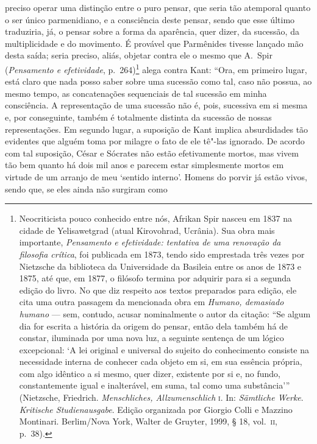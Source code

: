 preciso operar uma distinção entre o puro pensar, que seria tão atemporal
quanto o ser único parmenidiano, e a consciência deste pensar, sendo que esse
último traduziria, já, o pensar sobre a forma da aparência, quer dizer, da
sucessão, da multiplicidade e do movimento. É provável que Parmênides tivesse
lançado mão desta saída; seria preciso, aliás, objetar contra ele o mesmo que
A.~Spir (\textit{Pensamento e efetividade}, p.~264)\footnote{ Neocriticista
pouco conhecido entre nós, Afrikan Spir nasceu em 1837 na cidade de
Yelisawetgrad (atual Kirovohrad, Ucrânia). Sua obra mais importante, \textit{Pensamento 
e efetividade: tentativa de uma renovação da filosofia crítica},
foi publicada em 1873, tendo sido emprestada três vezes por Nietzsche da
biblioteca da Universidade da Basileia entre os anos de 1873 e 1875, até que,
em 1877, o filósofo termina por adquirir para si a segunda edição do livro.
No que diz respeito aos textos preparados para edição, ele cita uma outra
passagem da mencionada obra em \textit{Humano, demasiado humano} --- sem,
contudo, acusar nominalmente o autor da citação: ``Se algum dia for escrita a
história da origem do pensar, então dela também há de constar, iluminada por
uma nova luz, a seguinte sentença de um lógico excepcional: `A lei original e
universal do sujeito do conhecimento consiste na necessidade interna de
conhecer cada objeto em si, em sua essência própria, com algo idêntico a si
mesmo, quer dizer, existente por si e, no fundo, constantemente igual e
inalterável, em suma, tal como uma substância''' (Nietzsche, Friedrich.
\textit{Menschliches, Allzumenschlich} \textsc{i.} In:
\textit{Sämtliche Werke}. \textit{Kritische Studienausgabe}. Edição organizada
 por Giorgio Colli e Mazzino Montinari. Berlim/Nova York, Walter de Gruyter,
 1999, § 18, vol.~\textsc{ii}, p.~38).} alega contra Kant: ``Ora, em primeiro
 lugar, está claro que nada posso saber sobre uma sucessão como tal, caso não
 possua, ao mesmo tempo, as concatenações sequenciais de tal sucessão em
 minha consciência. A representação de uma sucessão não é, pois, sucessiva em
 si mesma e, por conseguinte, também é totalmente distinta da sucessão de
 nossas representações. Em segundo lugar, a suposição de Kant implica
 absurdidades tão evidentes que alguém toma por milagre o fato de ele tê"-las
 ignorado. De acordo com tal suposição, César e Sócrates não estão
 efetivamente mortos, mas vivem tão bem quanto há dois mil anos e parecem
 estar simplesmente mortos em virtude de um arranjo de meu `sentido interno'.
 Homens do porvir já estão vivos, sendo que, se eles ainda não surgiram como
